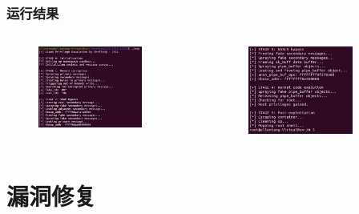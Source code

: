 \documentclass[xcolor=table]{beamer}
\begin{document}
\begin{frame}
\frametitle{运行结果}

\begin{columns}
\begin{figure}[H]
\centering
\includegraphics[width=0.8\textwidth]{pic/res1}%
\end{figure}



\begin{figure}[H]
\centering
\includegraphics[width=0.8\textwidth]{pic/res2}%
\end{figure}

	
\end{columns}


\end{frame}


\section{漏洞修复}
\end{document}
